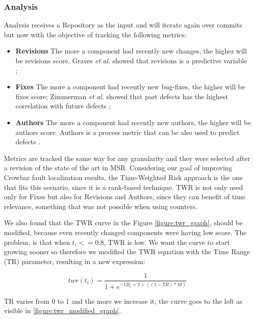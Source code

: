 \subsubsection{Analysis}
Analysis receives a Repository as the input and will iterate again over commits but now with the objective of tracking the following metrics: 

\begin{itemize}
\item \textbf{Revisions} The more a component had recently new changes, the higher will be revisions score. Graves \textit{et al.} showed that revisions is a predictive variable \cite{859533};
\item \textbf{Fixes} The more a component had recently new bug-fixes, the higher will be fixes score; Zimmerman \textit{et al.} showed that past defects has the highest correlation with future defects \cite{Zimmermann:2007:PDE:1268984.1269057};
\item \textbf{Authors} The more a component had recently new authors, the higher will be authors score. Authors is a process metric that can be also used to predict defects \cite{Moser:2008:CAE:1368088.1368114,D'Ambros:2012:EDP:2318097.2318149}.
\end{itemize}

Metrics are tracked the same way for any granularity and they were selected after a revision of the state of the art in MSR. 
Considering our goal of improving Crowbar fault localization results, the Time-Weighted Risk approach is the one that fits this scenario, since it is a rank-based technique. TWR is not only used only for Fixes but also for Revisions and Authors, since they can benefit of time relevance, something that was not possible when using counters.

We also found that the TWR curve in the Figure \ref{figure:twr_graph}, should be modified, because even recently changed components were having low score. The problem, is that when \( t_i <= 0.8 \), TWR is low. We want the curve to start growing sooner so therefore we modified the TWR equation with the Time Range (TR) parameter, resulting in a new expression:

\begin{equation}
twr(t_i) = \frac{1}{1 + e^{-12t_i + 2 + ( (1 - TR)* 10) }}
\end{equation}

TR varies from 0 to 1 and the more we increase it, the curve goes to the left as visible in \ref{figure:twr_modified_graph}.

